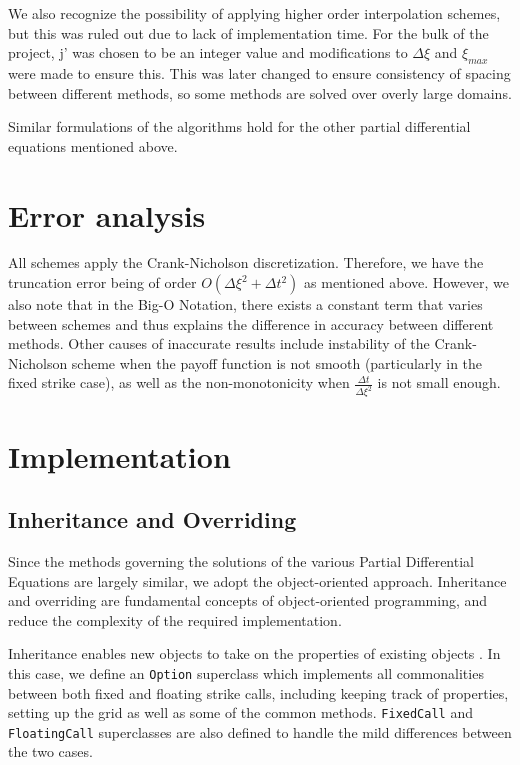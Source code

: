 \documentclass{article}
\begin{document}
We also recognize the possibility of applying higher order interpolation schemes, but this was ruled out due to lack of implementation time. For the bulk of the project, j' was chosen to be an integer value and modifications to \(\Delta\xi\) and \(\xi_{max}\) were made to ensure this. This was later changed to ensure consistency of spacing between different methods, so some methods are solved over overly large domains.

Similar formulations of the algorithms hold for the other partial differential equations mentioned above.

\section{Error analysis}
All schemes apply the Crank-Nicholson discretization. Therefore, we have the truncation error being of order \(O(\Delta\xi^2 + \Delta t^2)\) as mentioned above. However, we also note that in the Big-O Notation, there exists a constant term that varies between schemes and thus explains the difference in accuracy between different methods. Other causes of inaccurate results include instability of the Crank-Nicholson scheme when the payoff function is not smooth (particularly in the fixed strike case), as well as the non-monotonicity when \(\frac{\Delta t}{\Delta\xi^2}\) is not small enough.

\section{Implementation}

\subsection{Inheritance and Overriding}
Since the methods governing the solutions of the various Partial Differential Equations are largely similar, we adopt the object-oriented approach. Inheritance and overriding are fundamental concepts of object-oriented programming, and reduce the complexity of the required implementation.

Inheritance enables new objects to take on the properties of existing objects \cite{oop_inheritance}. In this case, we define an \texttt{Option} superclass which implements all commonalities between both fixed and floating strike calls, including keeping track of properties, setting up the grid as well as some of the common methods. \texttt{FixedCall} and \texttt{FloatingCall} superclasses are also defined to handle the mild differences between the two cases.
\end{document}
